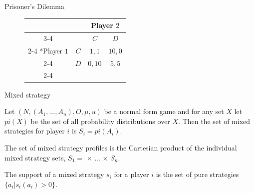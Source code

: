 \documentclass[10pt]{beamer} %
\theoremstyle{plain} %
\theoremstyle{definition} %
\begin{document}
\begin{frame}{\color{Maroon} Prisoner's Dilemma}

\begin{figure}[h]
\centering
\caption{Payoff Matrix framework of Standard Prisoner's Dilemma}
\label{Collective action problem in the Prisoners' Dilemma}
\begin{table}
    \setlength{\extrarowheight}{2pt}
    \begin{tabular}{*{4}{c|}}
      \multicolumn{2}{c}{} & \multicolumn{2}{c}{Player $2$}\\\cline{3-4}
      \multicolumn{1}{c}{} &  & $C$  & $D$ \\\cline{2-4}
      \multirow{2}*{Player $1$}  & $C$ & $1,1$ & $10,0$ \\\cline{2-4}
      & $D$ & $0,10$ & $5,5$ \\\cline{2-4}
    \end{tabular}
  \end{table}
\end{figure}

\end{frame}

\begin{frame}{\color{Maroon} Mixed strategy}
\begin{tcolorbox}
    \begin{definition} 
Let $(N, (A_1, ..., A_n), O, \mu, u)$ be a normal form game and for any set $X$ let $pi(X)$ be the set of all probability distributions over $X$. Then the set of mixed strategies for player $i$ is $S_i = pi(A_i)$.
    \end{definition}
    \end{tcolorbox}

\begin{tcolorbox}
    \begin{definition} 
    The set of mixed strategy profiles is the Cartesian product of the individual mixed strategy sets, $S_1 =$ $\times$ ... $ \times$ $S_n$.
    
    \end{definition}
    \end{tcolorbox}

    
\begin{tcolorbox}
        \begin{definition}[Support] 
The support of a mixed strategy $s_i$ for a player $i$ is the set of pure strategies $\{a_i | s_i(a_i) > 0\}$.
    \end{definition}
    \end{tcolorbox}


\end{frame}
\end{document}
